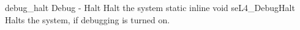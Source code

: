 %
%
%
%

\apidoc
{debug_halt}
{Debug - Halt}
{Halt the system}
{static inline void seL4\_DebugHalt}
{
}
{\noret}
{Halts the system, if debugging is turned on.}
